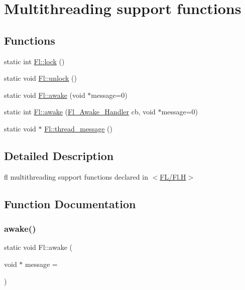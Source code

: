 \hypertarget{group__fl__multithread}{}\section{Multithreading support functions}
\label{group__fl__multithread}
\subsection*{Functions}
\begin{DoxyCompactItemize}
\item 
static int \hyperlink{group__fl__multithread_gab1a5652a8fd1a7e25db468d143c93ddf}{Fl\+::lock} ()
\item 
static void \hyperlink{group__fl__multithread_gaccda832deb874af4e9423db192ccfca4}{Fl\+::unlock} ()
\item 
static void \hyperlink{group__fl__multithread_ga3e0b97c90d624efd2362774efc0324e4}{Fl\+::awake} (void $\ast$message=0)
\item 
static int \hyperlink{group__fl__multithread_ga288e627211a59a853e4ab99873a53a2e}{Fl\+::awake} (\hyperlink{group__callback__functions_ga28b44ff2052ca0b06d0da852fadd42c0}{Fl\+\_\+\+Awake\+\_\+\+Handler} cb, void $\ast$message=0)
\item 
static void $\ast$ \hyperlink{group__fl__multithread_ga1fb3dbbd66eacb7ba26e0c0d724c0265}{Fl\+::thread\+\_\+message} ()
\end{DoxyCompactItemize}


\subsection{Detailed Description}
fl multithreading support functions declared in $<$\hyperlink{_fl_8_h}{F\+L/\+Fl.\+H}$>$ 

\subsection{Function Documentation}
\mbox{\label{group__fl__multithread_ga3e0b97c90d624efd2362774efc0324e4}} 
\subsubsection{\texorpdfstring{awake()}{awake()}\hspace{0.1cm}{\footnotesize\ttfamily [1/2]}}
{\footnotesize\ttfamily static void Fl\+::awake (\begin{DoxyParamCaption}\item[{void $\ast$}]{message = {} }\end{DoxyParamCaption})\hspace{0.3cm}{\ttfamily [static]}}

